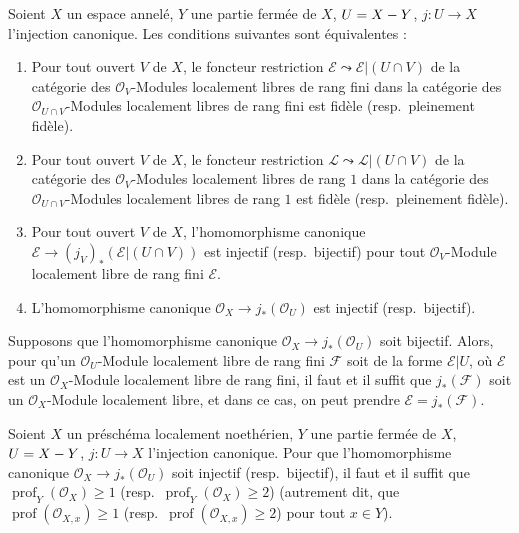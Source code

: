 \begin{corollary}[21.13.3]
\label{IV.21.13.3}
Soient $X$ un espace annelé, $Y$ une partie fermée de $X$, $U=X- Y$,
$j:U\to X$ l'injection canonique. Les conditions suivantes sont équivalentes :
\begin{enumerate}[label=\emph{\alph*)}]
  \item Pour tout ouvert $V$ de $X$, le foncteur restriction
  $\mathscr E\leadsto\mathscr E|(U\cap V)$ de la catégorie des
  $\mathcal O_V$-Modules localement libres de rang fini dans la catégorie des
  $\mathcal O_{U\cap V}$-Modules localement libres de rang fini est fidèle
  \textup{(resp.}\ pleinement fidèle\textup{)}.
  \item[\emph{a')}] Pour tout ouvert $V$ de $X$, le foncteur restriction
  $\mathscr L\leadsto\mathscr L|(U\cap V)$ de la catégorie des
  $\mathcal O_V$-Modules localement libres de rang $1$ dans la catégorie des
  $\mathcal O_{U\cap V}$-Modules localement libres de rang $1$ est fidèle
  \textup{(resp.}\ pleinement fidèle\textup{)}.
  \item Pour tout ouvert $V$ de $X$, l'homomorphisme canonique
  $\mathscr E\to(j_V)_*(\mathscr E|(U\cap V))$ est injectif \textup{(resp.}\ bijectif\textup{)} pour
  tout $\mathcal O_V$-Module localement libre de rang fini $\mathscr E$.
  \item[\emph{b')}] L'homomorphisme canonique
  $\mathcal O_X\to j_*(\mathcal O_U)$ est injectif \textup{(resp.}\ bijectif\textup{)}.
\end{enumerate}

Supposons que l'homomorphisme canonique $\mathcal O_X\to j_*(\mathcal O_U)$ soit
bijectif. Alors, pour qu'un $\mathcal O_U$-Module localement libre de rang fini
$\mathscr F$ soit de la forme $\mathscr E|U$, où $\mathscr E$ est un
$\mathcal O_X$-Module localement libre de rang fini, il faut et il suffit que
$j_*(\mathscr F)$ soit un $\mathcal O_X$-Module localement libre, et dans ce cas, on
peut prendre $\mathscr E=j_*(\mathscr F)$.
\end{corollary}

\begin{lemma}[21.13.4]
\label{IV.21.13.4}
Soient $X$ un préschéma localement noethérien, $Y$ une partie fermée de $X$,
$U=X- Y$, $j:U\to X$ l'injection canonique. Pour que l'homomorphisme canonique
$\mathcal O_X\to j_*(\mathcal O_U)$ soit injectif \textup{(resp.}\ bijectif\textup{)}, il faut et il
suffit que $\operatorname{prof}_Y(\mathcal O_X)\geq1$
\textup{(resp.\ $\operatorname{prof}_Y(\mathcal O_X)\geq2$) (autrement dit, que
$\operatorname{prof}(\mathcal O_{X,x})\geq1$
(resp.\ $\operatorname{prof}(\mathcal O_{X,x})\geq2$) pour tout $x\in Y$)}.
\end{lemma}


